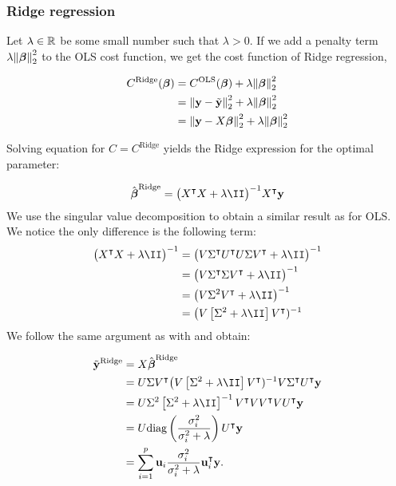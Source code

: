 \subsubsection{Ridge regression}\label{sec:Ridge}

Let $\lambda \in \mathbb{R}^{}$ be some small number such that $\lambda >0$. If we add a penalty term $\lambda \norm{\boldsymbol{\beta}}_2^2$ to the OLS cost function, we get the cost function of Ridge regression,

\begin{align*}
    C^\text{Ridge}(\boldsymbol{\beta}) &=  C^\text{OLS}(\boldsymbol{\beta}) + \lambda \norm{\boldsymbol{\beta}}_2^2 \\
    &=\norm{\mathbf{y}-\tilde{\mathbf{y}}}_2^{2}  + \lambda \norm{\boldsymbol{\beta}}_2^2 \\
    &= \norm{\mathbf{y}-X\boldsymbol{\beta}}_2^{2} + \lambda \norm{\boldsymbol{\beta}}_2^2 
\end{align*}

Solving equation  for $C=C^\mathrm{Ridge}$ yields the Ridge expression for the optimal parameter:

\begin{align*}
    \optbeta^\text{Ridge} = \big(\hessian + \lambda \II\big)^{-1} X\TT\vec{y}
\end{align*}
We use the singular value decomposition to obtain a similar result as for OLS. We notice the only difference is the following term:
\begin{align*}
    \big(\hessian + \lambda\II\big)^{-1} &= \big(V\ST\UT U\S\VT + \lambda\II\big)^{-1}\\
    &= \big(V\ST\S\VT + \lambda\II\big)^{-1} \\
    &=\big(V\S^2\VT + \lambda\II\big)^{-1} \\
    &= \big(V\left[\S^2+\lambda\II\right]\VT)^{-1}
\end{align*}
We follow the same argument as with  and obtain:

\begin{align}\label{eq:ridge_svd}
    \tilde{\vec{y}}^{\text{Ridge}} &=X\optbeta^{\text{Ridge}} \nonumber \\
    &= U\S\VT \big(V\left[\S^2+\lambda\II\right]\VT)^{-1} V\ST\UT\vec{y}\nonumber  \\
    &= U\S^2\left[\S^2+\lambda\II\right]^{-1} \VT V\VT V\UT\vec{y}\nonumber  \\
    &= U\text{diag}\left(\frac{\sigma_i^2}{\sigma_i^2+\lambda}\right)\UT\vec{y} \nonumber \\
    &= \sum_{i=1}^p\vec{u}_i\frac{\sigma_i^2}{\sigma_i^2+\lambda}\vec{u}\TT_i\vec{y}.
\end{align}

